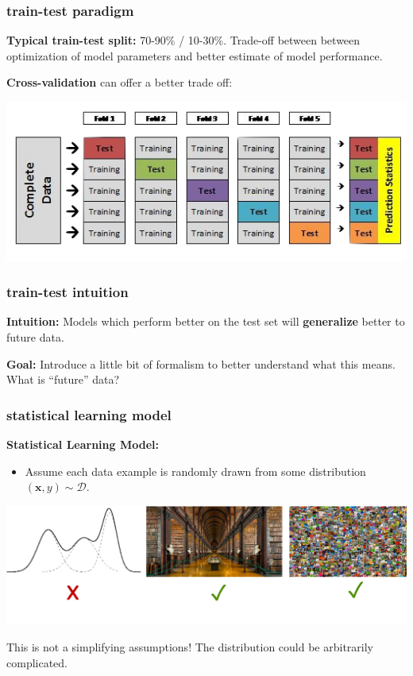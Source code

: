 \documentclass[handout,compress]{beamer}
\newcommand{\bv}[1]{\mathbf{#1}}
\begin{document}
\begin{frame}
	\frametitle{train-test paradigm}
	\textbf{Typical train-test split:} 70-90\% / 10-30\%.
	Trade-off between between optimization of model parameters and better estimate of model performance. 
	
	\textbf{Cross-validation} can offer a better trade off:
	\begin{center}
		\includegraphics[width=.7\textwidth]{crossval.png}
	\end{center}
	
\end{frame}

\begin{frame}
	\frametitle{train-test intuition}
	\textbf{Intuition:} Models which perform better on the test set will \alert{\textbf{generalize}} better to future data. 
	
	\vspace{2em}
	 \textbf{Goal:} Introduce a little bit of formalism to better understand what this means. What is ``future'' data?
\end{frame}




\begin{frame}
	\frametitle{statistical learning model}
	\textbf{Statistical Learning Model:}
	\begin{itemize}
		\item Assume each data example is randomly drawn from some distribution $(\bv{x},y)\sim \mathcal{D}$.
	\end{itemize}

	\begin{center}
		\includegraphics[width=.9\textwidth]{distributions.png}
		
		This is not a simplifying assumptions! The distribution could be arbitrarily complicated. 
	\end{center}
\end{frame}
\end{document}

